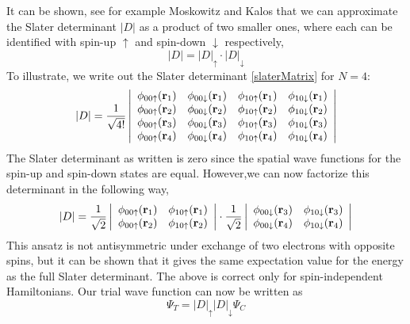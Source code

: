\documentclass[english, a4paper]{article}
\begin{document}
It can be shown, see for example Moskowitz and Kalos \cite{ref3} that we can approximate the Slater
determinant $|D|$ as a product of two smaller ones, where each can be identified with
spin-up $\uparrow$ and spin-down $\downarrow$ respectively,
\begin{equation}
 |D| = |D|_\uparrow \cdot |D|_\downarrow
\end{equation}
To illustrate, we write out the Slater determinant \eqref{slaterMatrix} for $N=4$:
\begin{equation}
    |D| = \frac{1}{\sqrt{4!}} \left|\begin{array}{cccc}
\phi_{00\uparrow}({\bf r}_1) &\phi_{00\downarrow}({\bf r}_1) 
&\phi_{10\uparrow}({\bf r}_1) &\phi_{10\downarrow}({\bf r}_1) \\
\phi_{00\uparrow}({\bf r}_2) &\phi_{00\downarrow}({\bf r}_2) 
&\phi_{10\uparrow}({\bf r}_2) &\phi_{10\downarrow}({\bf r}_2) \\
\phi_{00\uparrow}({\bf r}_3) &\phi_{00\downarrow}({\bf r}_3) 
&\phi_{10\uparrow}({\bf r}_3) &\phi_{10\downarrow}({\bf r}_3) \\
\phi_{00\uparrow}({\bf r}_4) &\phi_{00\downarrow}({\bf r}_4) 
&\phi_{10\uparrow}({\bf r}_4) &\phi_{10\downarrow}({\bf r}_4) \\
                      \end{array} \right|
\end{equation}
The Slater determinant as written is zero since the spatial wave functions for the
spin-up and spin-down states are equal. 
However,we can now factorize this determinant in the following way,
\begin{equation}
|D| = \frac{1}{\sqrt{2}}\left|\begin{array}{cc}
\phi_{00\uparrow}({\bf r}_1) &\phi_{10\uparrow}({\bf r}_1) \\
\phi_{00\uparrow}({\bf r}_2) &\phi_{10\uparrow}({\bf r}_2) \\
            \end{array} \right|
\cdot
\frac{1}{\sqrt{2}} \left| \begin{array}{cc}
\phi_{00\downarrow}({\bf r}_3) &\phi_{10\downarrow}({\bf r}_3) \\
\phi_{00\downarrow}({\bf r}_4) &\phi_{10\downarrow}({\bf r}_4) \\
       \end{array} \right|
       \label{SlaterDetFactorized}
\end{equation}
This ansatz is not antisymmetric under exchange of two electrons with opposite spins, but it can 
be shown that it gives the same expectation value for the energy as the full Slater determinant. 
The above is correct only for spin-independent Hamiltonians. Our trial wave function
can now be written as
\begin{equation}
 \Psi_T = |D|_\uparrow |D|_\downarrow \Psi_C
 \label{TrialWFSpins}
\end{equation}
\end{document}
